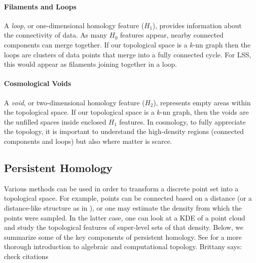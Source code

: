 \documentclass[12pt]{article}
\newcommand{\brittany}[1]{{\color{cyan} Brittany says: #1}}
\begin{document}
\paragraph{Filaments and Loops} A \emph{loop}, or one-dimensional homology feature ($H_1$), provides information about the connectivity of data. As many $H_0$ features appear, nearby connected components can merge together. If our topological space is a $k$-nn graph then the loops are clusters of data points that merge into a fully connected cycle.  For LSS, this would appear as filaments joining together in a loop.


\paragraph{Cosmological Voids}  A \emph{void}, or two-dimensional homology feature ($H_2$), represents empty areas within the topological space. If our topological space is a $k$-nn graph, then the voids are the unfilled spaces inside enclosed $H_1$ features.  In cosmology, to fully appreciate the topology, it is important to understand the high-density regions (connected components and loops) but also where matter is scarce. 

\subsection{Persistent Homology} 
Various methods can be used in order to transform a discrete point set into a topological space. For example, points can be connected based on a distance (or
a distance-like structure as in \citep{chazal2011geometric}), or one may estimate the density from which the points were sampled. 
In the latter case, one can look at a KDE of a point cloud and study the topological features of super-level sets of that density. Below, we summarize some of the key components of persistent homology. See \citep{edelsbrunner2010computational,hatcher2002algebraic,munkres1984elements} for a more thorough introduction to algebraic and computational topology. \brittany{check citations}
\end{document}
